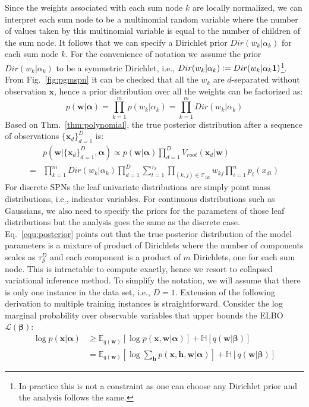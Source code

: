 \documentclass{article} %
\theoremstyle{definition}
\newcommand{\defeq}{\vcentcolon=}
\begin{document}
Since the weights associated with each sum node $k$ are locally normalized, we can interpret each sum node to be a multinomial random variable where the number of values taken by this multinomial variable is equal to the number of children of the sum node. It follows that we can specify a Dirichlet prior $Dir(w_k|\alpha_k)$ for each sum node $k$. For the convenience of notation we assume the prior $Dir(w_k|\alpha_k)$ to be a symmetric Dirichlet, i.e., $Dir(w_k|\alpha_k)\defeq Dir(w_k|\alpha_k\mathbf{1})$\footnote{In practice this is not a constraint as one can choose any Dirichlet prior and the analysis follows the same.}. From Fig.~\ref{fig:pgmspn} it can be checked that all the $w_k$ are $d$-separated without observation $\mathbf{x}$, hence a prior distribution over all the weights can be factorized as:
\begin{equation}
p(\mathbf{w}|\pmb\alpha) = \prod_{k=1}^m p(w_k|\alpha_k) = \prod_{k=1}^m Dir(w_k|\alpha_k)
\end{equation}
Based on Thm.~\ref{thm:polynomial}, the true posterior distribution after a sequence of observations $\{\mathbf{x}_d\}_{d=1}^D$ is:
\begin{align}
& p(\mathbf{w}|\{\mathbf{x}_d\}_{d=1}^D, \pmb\alpha) \propto p(\mathbf{w}|\pmb\alpha)\prod_{d=1}^D V_{root}(\mathbf{x}_d|\mathbf{w}) \nonumber\\
= & \prod_{k=1}^m Dir(w_k|\alpha_k)\prod_{d=1}^D \sum_{t=1}^{\tau_\mathcal{S}}\prod_{(k, j)\in\mathcal{T}_{tE}}w_{kj}\prod_{i=1}^n p_t(x_{di})
\label{equ:posterior}
\end{align}
For discrete SPNs the leaf univariate distributions are simply point mass distributions, i.e., indicator variables. For continuous distributions such as Gaussians, we also need to specify the priors for the parameters of those leaf distributions but the analysis goes the same as the discrete case. Eq.~\ref{equ:posterior} points out that the true posterior distribution of the model parameters is a mixture of product of Dirichlets where the number of components scales as $\tau_\mathcal{S}^D$ and each component is a product of $m$ Dirichlets, one for each sum node. This is intractable to compute exactly, hence we resort to collapsed variational inference method. To simplify the notation, we will assume that there is only one instance in the data set, i.e., $D = 1$. Extension of the following derivation to multiple training instances is straightforward. Consider the log marginal probability over observable variables that upper bounds the ELBO $\mathcal{L}(\pmb\beta)$:
\begin{align}
\log p(\mathbf{x}|\pmb\alpha) & \geq \mathbb{E}_{q(\mathbf{w})}[\log p(\mathbf{x}, \mathbf{w}| \pmb\alpha)] + \mathbb{H}[q(\mathbf{w}|\pmb\beta)] \\
& = \mathbb{E}_{q(\mathbf{w})}[\log\sum_{\mathbf{h}} p(\mathbf{x}, \mathbf{h}, \mathbf{w}| \pmb\alpha)] + \mathbb{H}[q(\mathbf{w}|\pmb\beta)] \nonumber
\label{equ:elbo}
\end{align}
\end{document}
